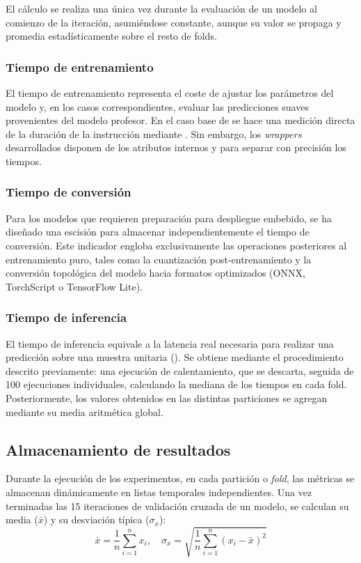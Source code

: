 \documentclass[a4paper,12pt,twoside,final]{book}
\begin{document}
El cálculo se realiza una única vez durante la evaluación de un modelo al comienzo de la iteración, asumiéndose
constante, aunque su valor se propaga y promedia estadísticamente sobre el resto de folds.

\subsubsection{Tiempo de entrenamiento}
El tiempo de entrenamiento representa el coste de ajustar los parámetros del modelo y, en los casos correspondientes,
evaluar las predicciones suaves provenientes del modelo profesor. En el caso base de  se hace una
medición directa de la duración de la instrucción  mediante . Sin embargo, los
\textit{wrappers} desarrollados disponen de los atributos internos  y  para
separar con precisión los tiempos.

\subsubsection{Tiempo de conversión}
Para los modelos que requieren preparación para despliegue embebido, se ha diseñado una escisión para almacenar
independientemente el tiempo de conversión. Este indicador engloba exclusivamente las operaciones posteriores
al entrenamiento puro, tales como la cuantización post-entrenamiento y la conversión topológica del modelo hacia
formatos optimizados (ONNX, TorchScript o TensorFlow Lite).

\subsubsection{Tiempo de inferencia}
El tiempo de inferencia equivale a la latencia real necesaria para realizar una predicción sobre una muestra unitaria
(). Se obtiene mediante el procedimiento descrito previamente: una ejecución de calentamiento, que se
descarta, seguida de 100 ejecuciones individuales, calculando la mediana de los tiempos en cada fold. Posteriormente,
los valores obtenidos en las distintas particiones se agregan mediante su media aritmética global.

\subsection{Almacenamiento de resultados}
Durante la ejecución de los experimentos, en cada partición o \textit{fold}, las métricas se almacenan dinámicamente en
listas temporales independientes. Una vez terminadas las 15 iteraciones de validación cruzada de un modelo, se calculan
su media ($\bar{x}$) y su desviación típica ($\sigma_x$):
\[
\bar{x} = \frac{1}{n} \sum_{i=1}^{n} x_i, \quad \sigma_x = \sqrt{\frac{1}{n} \sum_{i=1}^{n} (x_i - \bar{x})^2}
\]
\end{document}
